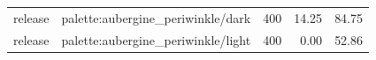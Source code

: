 \begin{longtable}{l>{\raggedright\arraybackslash}p{.42\linewidth}rrr}
release & %
palette:aubergine\_\allowbreak{}periwinkle/dark & %
400 & %
14.25 & %
84.75 \\ %

release & %
palette:aubergine\_\allowbreak{}periwinkle/light & %
400 & %
0.00 & %
52.86 \\ %


\end{longtable}
